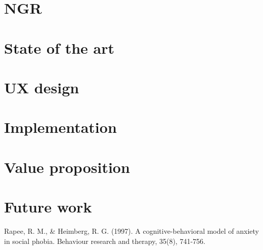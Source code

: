 \documentclass[letterpaper,12pt]{article}
\begin{document}
\section{NGR}
	
	\pagebreak
	
\section{State of the art}
	
	\pagebreak
	
\section{UX design}

\section{Implementation}
	
	\pagebreak
	
\section{Value proposition}
	
	\pagebreak

\section{Future work}



\begin{thebibliography}{99}

Rapee, R. M., \& Heimberg, R. G. (1997). A cognitive-behavioral model of anxiety in social phobia. Behaviour research and therapy, 35(8), 741-756.

\end{thebibliography}
\end{document}
